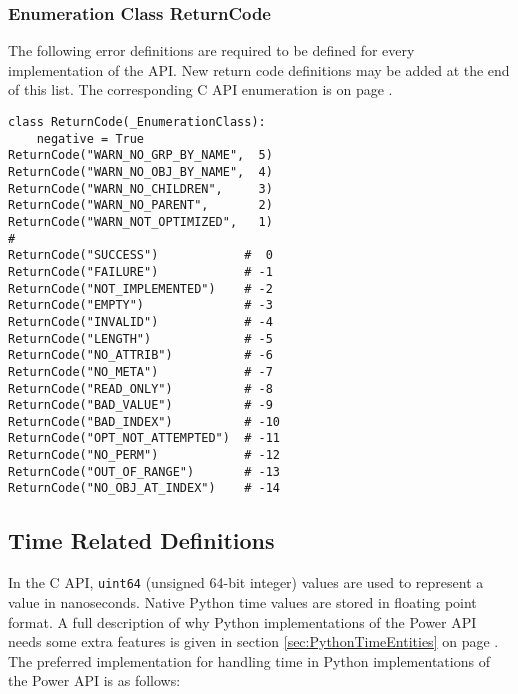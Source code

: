 \subsubsection{Enumeration Class ReturnCode}\label{class:ReturnCode}

The following error definitions are required to be defined for every
implementation of the API. New return code definitions may be added at the end
of this list. The corresponding C API enumeration is on page
\pageref{sec:ErrorReturnDefinitions}.

\begin{center}\begin{minipage}{.95\linewidth}\begin{lstlisting}
class ReturnCode(_EnumerationClass):
    negative = True
ReturnCode("WARN_NO_GRP_BY_NAME",  5)
ReturnCode("WARN_NO_OBJ_BY_NAME",  4)
ReturnCode("WARN_NO_CHILDREN",     3)
ReturnCode("WARN_NO_PARENT",       2)
ReturnCode("WARN_NOT_OPTIMIZED",   1)
#
ReturnCode("SUCCESS")            #  0
ReturnCode("FAILURE")            # -1
ReturnCode("NOT_IMPLEMENTED")    # -2
ReturnCode("EMPTY")              # -3
ReturnCode("INVALID")            # -4
ReturnCode("LENGTH")             # -5
ReturnCode("NO_ATTRIB")          # -6
ReturnCode("NO_META")            # -7
ReturnCode("READ_ONLY")          # -8
ReturnCode("BAD_VALUE")          # -9
ReturnCode("BAD_INDEX")          # -10
ReturnCode("OPT_NOT_ATTEMPTED")  # -11
ReturnCode("NO_PERM")            # -12
ReturnCode("OUT_OF_RANGE")       # -13
ReturnCode("NO_OBJ_AT_INDEX")    # -14
\end{lstlisting}\end{minipage}\end{center}

\subsection{Time Related Definitions}
\label{sec:PythonTimeRelatedDefinitions}

In the C API, \texttt{uint64} (unsigned 64-bit integer) values are used to represent a
value in nanoseconds. Native Python time values are stored in floating point
format. A full description of why Python implementations of the Power API needs
some extra features is given in section \ref{sec:PythonTimeEntities} on page
\pageref{sec:PythonTimeEntities}. The preferred implementation for handling
time in Python implementations of the Power API is as follows:

